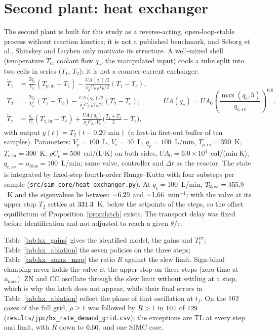 \documentclass[11pt]{article}
\begin{document}






\section{Second plant: heat exchanger}\label{supp:hx}
The second plant is built for this study as a reverse-acting, open-loop-stable process without reaction kinetics; it is not a published benchmark, and Seborg et al., Shinskey and Luyben only motivate its structure. A well-mixed shell (temperature $T_c$, coolant flow $q_c$, the manipulated input) cools a tube split into two cells in series ($T_1$, $T_2$); it is not a counter-current exchanger:
\begin{equation}
\begin{aligned}
\dot T_1 &= \tfrac{2q_p}{V_p}(T_{p,\mathrm{in}} - T_1) - \tfrac{UA(q_c)/2}{\rho_p C_{p,p} V_p/2}(T_1 - T_c), \\
\dot T_2 &= \tfrac{2q_p}{V_p}(T_1 - T_2) - \tfrac{UA(q_c)/2}{\rho_p C_{p,p} V_p/2}(T_2 - T_c), \\
\dot T_c &= \tfrac{q_c}{V_c}(T_{c,\mathrm{in}} - T_c) + \tfrac{UA(q_c)}{\rho_c C_{p,c} V_c}\bigl(\tfrac{T_1 + T_2}{2} - T_c\bigr),
\end{aligned}
\qquad UA(q_c) = UA_0\left(\frac{\max(q_c, 5)}{q_{c,ss}}\right)^{0.8},
\label{eq:hx}
\end{equation}
with output $y(t) = T_2(t - 0.20\text{ min})$ (a first-in first-out buffer of ten samples). Parameters: $V_p = 100$~L, $V_c = 40$~L, $q_p = 100$~L/min, $T_{p,\mathrm{in}} = 390$~K, $T_{c,\mathrm{in}} = 300$~K, $\rho C_p = 500$~cal/(L$\cdot$K) on both sides, $UA_0 = 6.0\times 10^4$~cal/(min$\cdot$K), $q_{c,ss} = u_{\text{bias}} = 100$~L/min; same valve, controller and $\Delta t$ as the reactor. The state is integrated by fixed-step fourth-order Runge--Kutta with four substeps per sample (\texttt{src/sim\_core/heat\_exchanger.py}). At $q_c = 100$~L/min, $T_{2,ss} = 355.9$~K and the eigenvalues lie between $-6.29$ and $-1.66$~min$^{-1}$; with the valve at its upper stop $T_2$ settles at $331.3$~K, below the setpoints of the steps, so the offset equilibrium of Proposition~\ref{prop:latch} exists. The transport delay was fixed before identification and not adjusted to reach a given $\theta/\tau$.

Table~\ref{tab:hx_gains} gives the identified model, the gains and $T_t^{\mathrm{cv}}$; Table~\ref{tab:hx_ablation} the seven policies on the three steps; Table~\ref{tab:hx_smax_map} the ratio $R$ against the slew limit. Sign-blind clamping never holds the valve at the upper stop on these steps (zero time at $u_{\max}$): ZN and CC oscillate through the slew limit without settling at a stop, which is why the latch does not appear, while their final errors in Table~\ref{tab:hx_ablation} reflect the phase of that oscillation at $t_f$. On the $162$ cases of the full grid, $\rho \ge 1$ was followed by $R > 1$ in $104$ of $129$ (\texttt{results/jpc/hx\_rate\_demand\_grid.csv}); the exceptions are TL at every step and limit, with $R$ down to $0.60$, and one SIMC case.
\end{document}
